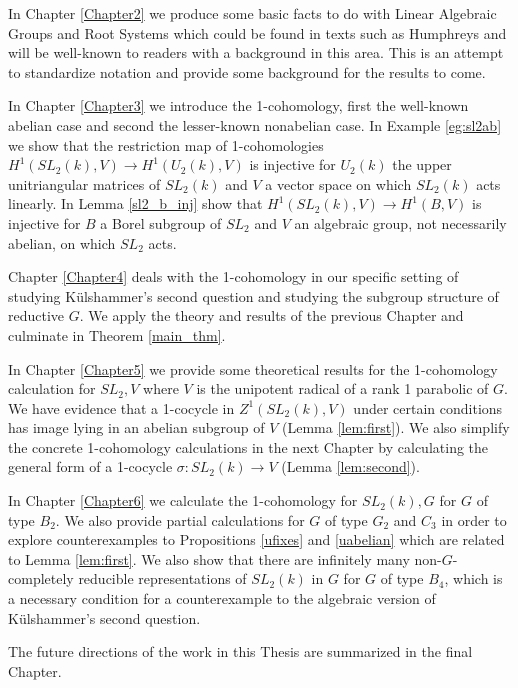 In Chapter \ref{Chapter2} we produce some basic facts to do with Linear Algebraic Groups and Root Systems which could be found in texts such as Humphreys \cite{humphreys1975linear} and will be well-known to readers with a background in this area. This is an attempt to standardize notation and provide some background for the results to come.

In Chapter \ref{Chapter3} we introduce the 1-cohomology, first the well-known abelian case and second the lesser-known nonabelian case. In Example \ref{eg:sl2ab} we show that the restriction map of 1-cohomologies $H^1(SL_2(k), V) \rightarrow H^1(U_2(k), V)$ is injective for $U_2(k)$ the upper unitriangular matrices of $SL_2(k)$ and $V$ a vector space on which $SL_2(k)$ acts linearly. In Lemma \ref{sl2_b_inj} show that $H^1(SL_2(k), V) \rightarrow H^1(B, V)$ is injective for $B$ a Borel subgroup of $SL_2$ and $V$ an algebraic group, not necessarily abelian, on which $SL_2$ acts.

Chapter \ref{Chapter4} deals with the 1-cohomology in our specific setting of studying K\"ulshammer's second question and studying the subgroup structure of reductive $G$. We apply the theory and results of the previous Chapter and culminate in Theorem \ref{main_thm}.

In Chapter \ref{Chapter5} we provide some theoretical results for the 1-cohomology calculation for $SL_2, V$ where $V$ is the unipotent radical of a rank 1 parabolic of $G$. We have evidence that a 1-cocycle in $Z^1(SL_2(k), V)$ under certain conditions has image lying in an abelian subgroup of $V$ (Lemma \ref{lem:first}). We also simplify the concrete 1-cohomology calculations in the next Chapter by calculating the general form of a 1-cocycle $\sigma:SL_2(k)\rightarrow V$ (Lemma \ref{lem:second}).

In Chapter \ref{Chapter6} we calculate the 1-cohomology for $SL_2(k), G$ for $G$ of type $B_2$. We also provide partial calculations for $G$ of type $G_2$ and $C_3$ in order to explore counterexamples to Propositions \ref{ufixes} and \ref{uabelian} which are related to Lemma \ref{lem:first}. We also show that there are infinitely many non-$G$-completely reducible representations of $SL_2(k)$ in $G$ for $G$ of type $B_4$, which is a necessary condition for a counterexample to the algebraic version of K\"ulshammer's second question.

The future directions of the work in this Thesis are summarized in the final Chapter.

